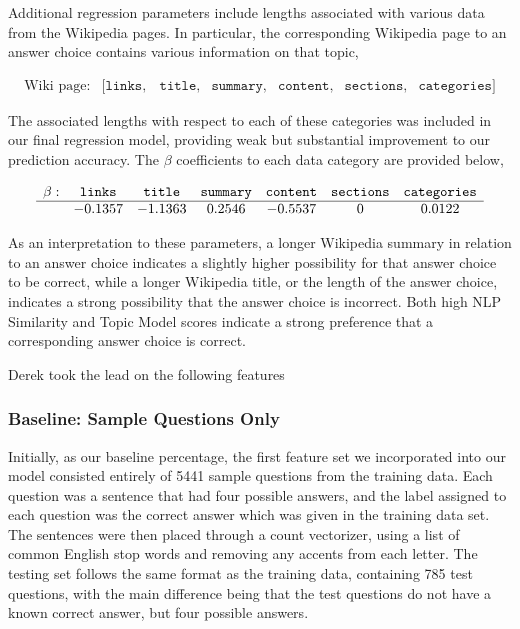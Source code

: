 \documentclass{article}
\theoremstyle{mystuff}
\theoremstyle{myexample}
\theoremstyle{named}
\begin{document}
Additional regression parameters include lengths associated with various data from the Wikipedia pages. In particular, the corresponding Wikipedia page to an answer choice contains various information on that topic,

\[
	\begin{array}{lllllll}
		\text{Wiki page}: & [\texttt{links}, & \texttt{title}, & \texttt{summary}, & \texttt{content}, & \texttt{sections}, & \texttt{categories}]
	\end{array}
\]

The associated lengths with respect to each of these categories was included in our final regression model, providing weak but substantial improvement to our prediction accuracy. The $\beta$ coefficients  to each data category are provided below,

\[
	\begin{array}{lcccccc}
		\textbf{$\beta$}: & \texttt{links} & \texttt{title} & \texttt{summary} & \texttt{content} & \texttt{sections} & \texttt{categories} \\\hline
			& -0.1357 & -1.1363 & 0.2546 & -0.5537 & 0 & 0.0122
	\end{array}
\]

\noindent As an interpretation to these parameters, a longer Wikipedia summary in relation to an answer choice indicates a slightly higher possibility for that answer choice to be correct, while a longer Wikipedia title, or the length of the answer choice, indicates a strong possibility that the answer choice is incorrect. Both high NLP Similarity and Topic Model scores indicate a strong preference that a corresponding answer choice is correct.

Derek took the lead on the following features
\subsubsection{Baseline: Sample Questions Only}
Initially, as our baseline percentage, the first feature set we incorporated into our model consisted entirely of 5441 sample questions from the training data.  Each question was a sentence that had four possible answers, and the label assigned to each question was the correct answer which was given in the training data set.\\

 The sentences were then placed through a count vectorizer, using a list of common English stop words and removing any accents from each letter.  The testing set follows the same format as the training data, containing 785 test questions, with the main difference being that the test questions do not have a known correct answer, but four possible answers. \\
\end{document}
